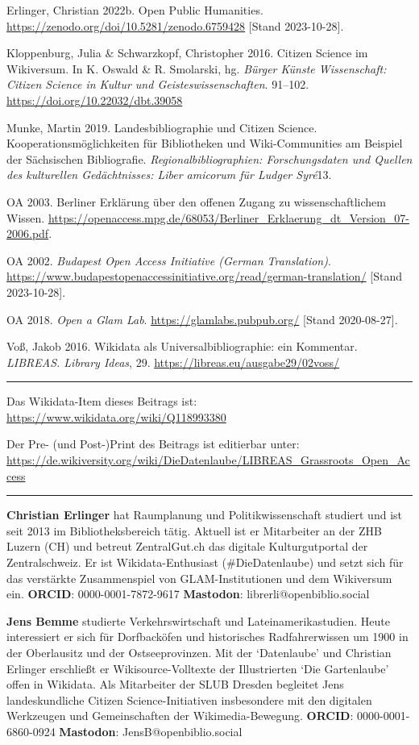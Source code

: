\documentclass[a4paper,
fontsize=11pt,
oneside,
numbers=noperiodatend,
parskip=half-,
bibliography=totoc,
final
]{scrartcl}
\begin{document}
Erlinger, Christian 2022b. Open Public Humanities.
\url{https://zenodo.org/doi/10.5281/zenodo.6759428} {[}Stand
2023-10-28{]}.

Kloppenburg, Julia \& Schwarzkopf, Christopher 2016. Citizen Science im
Wikiversum. In K. Oswald \& R. Smolarski, hg. \emph{Bürger Künste
Wissenschaft: Citizen Science in Kultur und Geisteswissenschaften}.
91--102. \url{https://doi.org/10.22032/dbt.39058}

Munke, Martin 2019. Landesbibliographie und Citizen Science.
Kooperationsmöglichkeiten für Bibliotheken und Wiki-Communities am
Beispiel der Sächsischen Bibliograﬁe. \emph{Regionalbibliographien:
Forschungsdaten und Quellen des kulturellen Gedächtnisses: Liber
amicorum für Ludger Syré}13.

OA 2003. Berliner Erklärung über den offenen Zugang zu
wissenschaftlichem Wissen.
\url{https://openaccess.mpg.de/68053/Berliner_Erklaerung_dt_Version_07-2006.pdf}.

OA 2002. \emph{Budapest Open Access Initiative (German Translation)}.
\url{https://www.budapestopenaccessinitiative.org/read/german-translation/}
{[}Stand 2023-10-28{]}.

OA 2018. \emph{Open a Glam Lab}. \url{https://glamlabs.pubpub.org/}
{[}Stand 2020-08-27{]}.

Voß, Jakob 2016. Wikidata als Universalbibliographie: ein Kommentar.
\emph{LIBREAS. Library Ideas}, 29.
\url{https://libreas.eu/ausgabe29/02voss/}

\begin{center}\rule{0.5\linewidth}{0.5pt}\end{center}

Das Wikidata-Item dieses Beitrags ist:
\url{https://www.wikidata.org/wiki/Q118993380}

Der Pre- (und Post-)Print des Beitrags ist editierbar unter:
\url{https://de.wikiversity.org/wiki/DieDatenlaube/LIBREAS_Grassroots_Open_Access}

\begin{center}\rule{0.5\linewidth}{0.5pt}\end{center}

\textbf{Christian Erlinger} hat Raumplanung und Politikwissenschaft
studiert und ist seit 2013 im Bibliotheksbereich tätig. Aktuell ist er
Mitarbeiter an der ZHB Luzern (CH) und betreut ZentralGut.ch das
digitale Kulturgutportal der Zentralschweiz. Er ist Wikidata-Enthusiast
(\#DieDatenlaube) und setzt sich für das verstärkte Zusammenspiel von
GLAM-Institutionen und dem Wikiversum ein. \textbf{ORCID}:
0000-0001-7872-9617 \textbar{} \textbf{Mastodon}:
librerli@openbiblio.social

\textbf{Jens Bemme} studierte Verkehrswirtschaft und
Lateinamerikastudien. Heute interessiert er sich für Dorfbacköfen und
historisches Radfahrerwissen um 1900 in der Oberlausitz und der
Ostseeprovinzen. Mit der `Datenlaube' und Christian Erlinger erschließt
er Wikisource-Volltexte der Illustrierten `Die Gartenlaube' offen in
Wikidata. Als Mitarbeiter der SLUB Dresden begleitet Jens
landeskundliche Citizen Science-Initiativen insbesondere mit den
digitalen Werkzeugen und Gemeinschaften der Wikimedia-Bewegung.
\textbf{ORCID}: 0000-0001-6860-0924 \textbar{} \textbf{Mastodon}:
JensB@openbiblio.social
\end{document}
